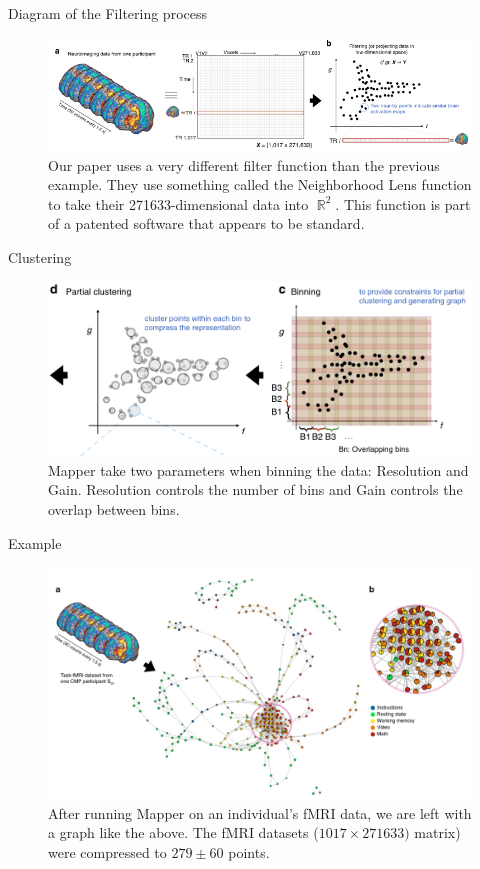 \documentclass[handout]{beamer}
\DeclareMathOperator{\R}{\mathbb{R}}
\begin{document}
\begin{frame}{Diagram of the Filtering process}
    \begin{figure}
        \includegraphics[width = 0.9\linewidth]{fig1ab.png}
        \caption{Our paper uses a very different filter function than the previous example. They use something called the Neighborhood Lens function to take their 271633-dimensional data into $\R^2$. This function is part of a patented software that appears to be standard.}
    \end{figure}
\end{frame}

\begin{frame}{Clustering}
    \begin{figure}
        \includegraphics[width=0.8\linewidth]{fig1cd.png}
        \caption{Mapper take two parameters when binning the data: Resolution and Gain. Resolution controls the number of bins and Gain controls the overlap between bins.}
    \end{figure}
\end{frame}

\begin{frame}{Example}
    \begin{figure}
        \includegraphics[width = 0.85\linewidth]{fig2.png}
        \caption{After running Mapper on an individual's fMRI data, we are left with a graph like the above. The fMRI datasets ($1017\times271633)$ matrix) were compressed to $279\pm60$ points.}
    \end{figure}
\end{frame}
\end{document}
